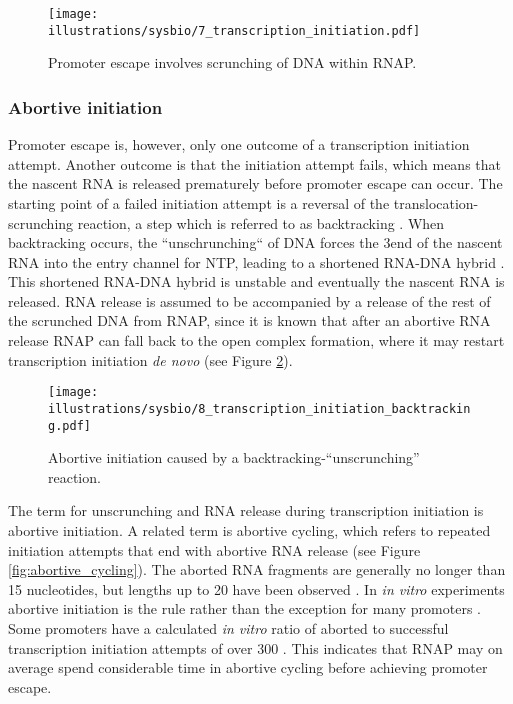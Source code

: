 \begin{figure}[htb]
	\begin{center}
		\texttt{[image: illustrations/sysbio/7\_transcription\_initiation.pdf]}
	\end{center}
	\caption{Promoter escape involves scrunching of DNA within RNAP.}
	\label{fig:simple_escape}
\end{figure}

\subsubsection{Abortive initiation}
Promoter escape is, however, only one outcome of a transcription initiation
attempt. Another outcome is that the initiation attempt fails, which means that
the nascent RNA is released prematurely before promoter escape can occur. The
starting point of a failed initiation attempt is a reversal of the
translocation-scrunching reaction, a step which is referred to as backtracking
\cite{hsu_initial_2006}. When backtracking occurs, the ``unschrunching`` of
DNA forces the 3\ppp end of the nascent RNA into the entry channel for NTP,
leading to a shortened RNA-DNA hybrid \cite{hsu_initial_2006}. This shortened
RNA-DNA hybrid is unstable and eventually the nascent RNA is released. RNA
release is assumed to be accompanied by a release of the rest of the scrunched
DNA from RNAP, since it is known that after an abortive RNA release RNAP can
fall back to the open complex formation, where it may restart transcription
initiation \textit{de novo} \cite{hsu_promoter_2002} (see Figure
\ref{fig:abortive_backtrack}).

\begin{figure}[htb]
	\begin{center}
		\texttt{[image: illustrations/sysbio/8\_transcription\_initiation\_backtracking.pdf]}
	\end{center}
	\caption{Abortive initiation caused by a backtracking-``unscrunching''
	reaction.}
	\label{fig:abortive_backtrack}
\end{figure}

The term for unscrunching and RNA release during transcription initiation is
abortive initiation. A related term is abortive cycling, which refers to
repeated initiation attempts that end with abortive RNA release (see Figure
\ref{fig:abortive_cycling}). The aborted RNA fragments are generally no longer
than 15 nucleotides, but lengths up to 20 have been observed
\cite{chander_alternate_2007}. In \textit{in vitro} experiments abortive
initiation is the rule rather than the exception for many promoters
\cite{hsu_promoter_2002}. Some promoters have a calculated \textit{in vitro}
ratio of aborted to successful transcription initiation attempts of over 300
\cite{hsu_initial_2006}. This indicates that RNAP may on average spend
considerable time in abortive cycling before achieving promoter escape.

